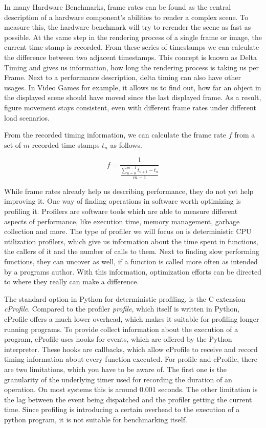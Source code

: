 In many Hardware Benchmarks, frame rates can be found as the central description
of a hardware component's abilities to render a complex scene. To measure this,
the hardware benchmark will try to rerender the scene as fast as possible. At
the same step in the rendering process of a single frame or image, the current
time stamp is recorded. From these series of timestamps we can calculate the
difference between two adjacent timestamps. This concept is known as Delta
Timing and gives us information, how long the rendering process is taking us per
Frame. Next to a performance description, delta timing can also have other
usages. In Video Games for example, it allows us to find out, how far an object
in the displayed scene should have moved since the last displayed frame. As a
result, figure movement stays consistent, even with different frame rates under
different load scenarios.
\cite{DeltaTiming}

From the recorded timing information, we can calculate the frame rate $f$ from a
set of $m$ recorded time stamps $t_n$ as follows.
\cite{FrameRates}

$$f = \frac{1}{\frac{ \sum_{n=0}^{m-1} t_{n+1} - t_{n} }{ m - 1 }}$$

While frame rates already help us describing performance, they do not yet help
improving it. One way of finding operations in software worth optimizing is
profiling it.  Profilers are software tools which are able to measure different
aspects of performance, like execution time, memory management, garbage
collection and more. The type of profiler we will focus on is deterministic CPU
utilization profilers, which give us information about the time spent in
functions, the callers of it and the number of calls to them. Next to finding
slow performing functions, they can uncover as well, if a function is called
more often as intended by a programs author. With this information, optimization
efforts can be directed to where they really can make a difference.
\cite{CProfilerExample}

The standard option in Python for deterministic profiling, is the C extension
\emph{cProfile}. Compared to the profiler \emph{profile}, which itself is
written in Python, cProfile offers a much lower overhead, which makes it
suitable for profiling longer running programs.  To provide collect information
about the execution of a program, cProfile uses hooks for events, which are
offered by the Python interpreter. These hooks are callbacks, which allow
cProfile to receive and record timing information about every function executed.
For profile and cProfile, there are two limitations, which you have to be aware
of. The first one is the granularity of the underlying
timer used for recording the duration of an operation. On most systems this is
around 0.001 seconds.  The other limitation is the lag between the event being
dispatched and the profiler getting the current time. Since profiling is
introducing a certain overhead to the execution of a python program, it is not
suitable for benchmarking itself.
\cite{CProfiler}
